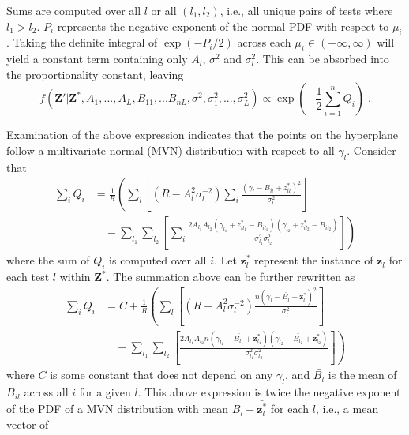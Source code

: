 \documentclass{article}
\newcommand{\nsamples}{n}
\newcommand{\sample}{i}
\newcommand{\normean}{\mu}
\newcommand{\normvar}{\sigma^2}
\newcommand{\modifier}{\gamma}
\newcommand{\logcount}{z}
\newcommand{\oriobs}[0]{\mathbf{\logcount}}
\newcommand{\instance}[0]{\mathbf{\logcount}^*}
\newcommand{\matinst}[0]{\mathbf{Z^*}}
\newcommand{\modmat}[0]{\mathbf{Z}'}
\newcommand{\test}{l}
\newcommand{\ntests}{L}
\newcommand{\scaling}{A}
\newcommand{\interceptor}{B}
\newcommand{\scalar}{\scaling_\test}
\newcommand{\intercept}{\interceptor_{\sample\test}}
\newcommand{\meanintercept}{\bar{\interceptor_\test}}
\newcommand{\testvar}{\normvar_\test}
\newcommand{\dt}{\modifier_\test}
\newcommand{\matlogcount}{\logcount^*_{\sample\test}}
\newcommand{\internalQ}{Q_\sample}
\newcommand{\internalR}{R}
\newcommand{\internalP}{P_\sample}
\newcommand{\inverttestvar}{\sigma^{-2}_\test}
\newcommand{\testone}{\test_1}
\newcommand{\testtwo}{\test_2}
\newcommand{\scalarone}{\scaling_{\testone}}
\newcommand{\interceptone}{\interceptor_{\sample\testone}}
\newcommand{\scalartwo}{\scaling_{\testtwo}}
\newcommand{\intercepttwo}{\interceptor_{\sample\testtwo}}
\newcommand{\dtone}{\modifier_{\testone}}
\newcommand{\dttwo}{\modifier_{\testtwo}}
\newcommand{\testvarone}{\normvar_{\testone}}
\newcommand{\testvartwo}{\normvar_{\testtwo}}
\newcommand{\matlogcountone}{\logcount^*_{\sample\testone}}
\newcommand{\matlogcounttwo}{\logcount^*_{\sample\testtwo}}
\newcommand{\testcolumn}[0]{\oriobs_\test}
\newcommand{\testinstance}[0]{\instance_\test}
\newcommand{\testinstone}[0]{\instance_{\testone}}
\newcommand{\testinsttwo}[0]{\instance_{\testtwo}}
\newcommand{\constant}{C}
\begin{document}
Sums are computed over all $\test$ or all $(\testone, \testtwo)$, i.e., all unique pairs of tests where $\testone > \testtwo$.
$\internalP$ represents the negative exponent of the normal PDF with respect to $\normean_\sample$.
Taking the definite integral of $\exp(-\internalP/2)$ across each $\normean_\sample \in (-\infty, \infty)$ will yield a constant term containing only $\scalar$, $\normvar$ and $\testvar$. 
This can be absorbed into the proportionality constant, leaving
\[
f(\modmat | \matinst, \scaling_1, ..., \scaling_\ntests, \interceptor_{11}, ... \interceptor_{\nsamples\ntests}, \normvar, \normvar_1, ..., \normvar_\ntests) 
	\propto \exp\left(-\frac{1}{2} \sum_{\sample=1}^\nsamples \internalQ \right) \;.
\]

Examination of the above expression indicates that the points on the hyperplane follow a multivariate normal (MVN) distribution with respect to all $\dt$. 
Consider that
\begin{align*}
\sum_\sample \internalQ &= \frac{1}{\internalR} \left( \sum_\test \left[ (\internalR - \scalar^2 \inverttestvar) \sum_\sample \frac{(\dt - \intercept + \matlogcount)^2}{\testvar} \right] \right. \\
    & \quad - \left. \sum_{\testone} \sum_{\testtwo} \left[ \sum_\sample \frac{2\scalarone\scalartwo(\dtone + \matlogcountone - \interceptone)(\dttwo + \matlogcounttwo - \intercepttwo)}{\testvarone\testvartwo} \right] \right)
\end{align*}
where the sum of $\internalQ$ is computed over all $\sample$.
Let $\testinstance$ represent the instance of $\testcolumn$ for each test $\test$ within $\matinst$.
The summation above can be further rewritten as
\begin{align*}
\sum_i \internalQ &= \constant + \frac{1}{\internalR} \left( \sum_\test \left[ (\internalR - \scalar^2 \inverttestvar) \frac{\nsamples (\dt - \meanintercept + \bar{\testinstance})^2}{\testvar} \right] \right. \\
    &\quad - \left. \sum_{\testone} \sum_{\testtwo} \left[ \frac{2\scalarone\scalartwo\nsamples(\dtone - \bar{\interceptor_{\testone}} + \bar{\testinstone})(\dttwo - \bar{\interceptor_{\testtwo}} + \bar{\testinsttwo})}{\testvarone\testvartwo} \right] \right) 
\end{align*}
where $\constant$ is some constant that does not depend on any $\dt$, and $\meanintercept$ is the mean of $\intercept$ across all $\sample$ for a given $\test$.
This above expression is twice the negative exponent of the PDF of a MVN distribution with mean $\meanintercept - \bar{\testinstance}$ for each $\test$, i.e., a mean vector of 
\end{document}
